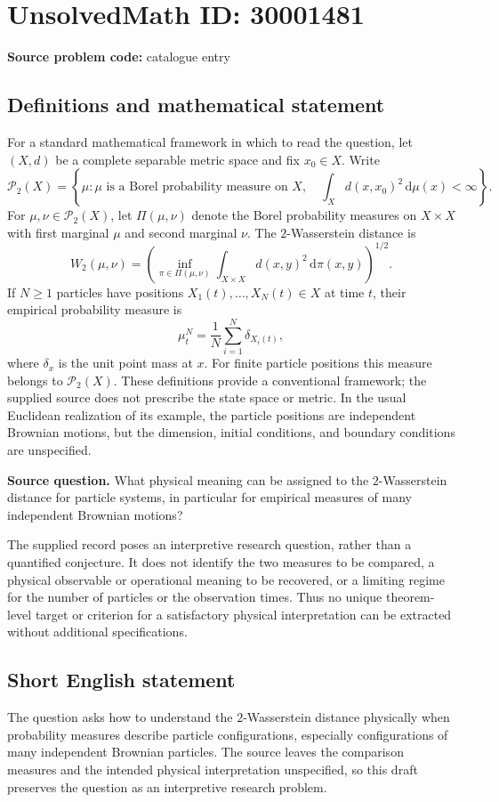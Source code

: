 \documentclass[11pt]{article}
\begin{document}
\section*{UnsolvedMath ID: 30001481}
\textbf{Source problem code:} catalogue entry
\subsection{Definitions and mathematical statement}
For a standard mathematical framework in which to read the question, let \((X,d)\) be a complete separable metric space and fix \(x_0\in X\). Write
\[
\mathcal P_2(X)=\left\{\mu:\mu\text{ is a Borel probability measure on }X,\quad \int_X d(x,x_0)^2\,\mathrm d\mu(x)<\infty\right\}.
\]
For \(\mu,\nu\in\mathcal P_2(X)\), let \(\Pi(\mu,\nu)\) denote the Borel probability measures on \(X\times X\) with first marginal \(\mu\) and second marginal \(\nu\). The \(2\)-Wasserstein distance is
\[
W_2(\mu,\nu)=\left(\inf_{\pi\in\Pi(\mu,\nu)}\int_{X\times X}d(x,y)^2\,\mathrm d\pi(x,y)\right)^{1/2}.
\]
If \(N\geq1\) particles have positions \(X_1(t),\ldots,X_N(t)\in X\) at time \(t\), their empirical probability measure is
\[
\mu_t^N=\frac1N\sum_{i=1}^N\delta_{X_i(t)},
\]
where \(\delta_x\) is the unit point mass at \(x\). For finite particle positions this measure belongs to \(\mathcal P_2(X)\). These definitions provide a conventional framework; the supplied source does not prescribe the state space or metric. In the usual Euclidean realization of its example, the particle positions are independent Brownian motions, but the dimension, initial conditions, and boundary conditions are unspecified.

\textbf{Source question.} What physical meaning can be assigned to the \(2\)-Wasserstein distance for particle systems, in particular for empirical measures of many independent Brownian motions?

The supplied record poses an interpretive research question, rather than a quantified conjecture. It does not identify the two measures to be compared, a physical observable or operational meaning to be recovered, or a limiting regime for the number of particles or the observation times. Thus no unique theorem-level target or criterion for a satisfactory physical interpretation can be extracted without additional specifications.
\subsection{Short English statement}
The question asks how to understand the \(2\)-Wasserstein distance physically when probability measures describe particle configurations, especially configurations of many independent Brownian particles. The source leaves the comparison measures and the intended physical interpretation unspecified, so this draft preserves the question as an interpretive research problem.
\end{document}
